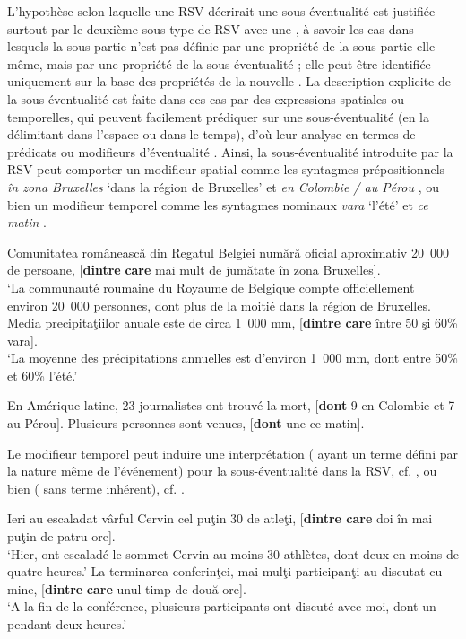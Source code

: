 L’hypothèse selon laquelle une RSV décrirait une sous-éventualité est justifiée surtout par le deuxième sous-type de RSV avec une , à savoir les cas dans lesquels la sous-partie n’est pas définie par une propriété de la sous-partie elle-même, mais par une propriété de la sous-éventualité ; elle peut être identifiée uniquement sur la base des propriétés de la nouvelle . La description explicite de la sous-éventualité est faite dans ces cas par des expressions spatiales ou temporelles, qui peuvent facilement prédiquer sur une sous-éventualité (en la délimitant dans l’espace ou dans le temps), d’où leur analyse en termes de prédicats ou modifieurs d’éventualité \citep{Rothstein2004}. Ainsi, la sous-éventualité introduite par la RSV peut comporter un modifieur spatial comme les syntagmes prépositionnels \textit{în zona Bruxelles} ‘dans la région de Bruxelles’  et \textit{en Colombie / au Pérou} , ou bien un modifieur temporel comme les syntagmes nominaux \textit{vara} ‘l’été’  et \textit{ce matin} .

\ea \label{ch3:ex76} 
\ea 
Comunitatea românească din Regatul Belgiei numără oficial aproximativ 20~000 de persoane, [\textbf{dintre} \textbf{care} mai mult de jumătate în zona Bruxelles]. \label{ch3:ex76a}\\
\glt ‘La communauté roumaine du Royaume de Belgique compte officiellement environ 20~000 personnes, dont plus de la moitié dans la région de Bruxelles.
\ex 
Media precipitaţiilor anuale este de circa 1~000 mm, [\textbf{dintre care} între 50 şi 60\% vara]. \label{ch3:ex76b}\\
\glt ‘La moyenne des précipitations annuelles est d’environ 1~000 mm, dont entre 50\% et 60\% l’été.’
\z 
\z

\ea \label{ch3:ex77}
\ea 
En Amérique latine, 23 journalistes ont trouvé la mort, [\textbf{dont} 9 en Colombie et 7 au Pérou]. \label{ch3:ex77a} 
\ex
Plusieurs personnes sont venues, [\textbf{dont} une ce matin]. \label{ch3:ex77b}
\z 
\z

Le modifieur temporel peut induire une interprétation  ({\cad} ayant un terme défini par la nature même de l’événement) pour la sous-éventualité dans la RSV, cf. , ou bien  ({\cad} sans terme inhérent), cf. .

\ea \label{ch3:ex78}
\ea 
Ieri au escaladat vârful Cervin cel puţin 30 de atleţi, [\textbf{dintre care} doi în mai puţin de patru ore]. \label{ch3:ex78a}\\
\glt ‘Hier, ont escaladé le sommet Cervin au moins 30 athlètes, dont deux en moins de quatre heures.’
\ex 
La terminarea conferinţei, mai mulţi participanţi au discutat cu mine, [\textbf{dintre} \textbf{care} unul timp de două ore]. \label{ch3:ex78b}\\
\glt ‘A la fin de la conférence, plusieurs participants ont discuté avec moi, dont un pendant deux heures.’  
\z 
\z


